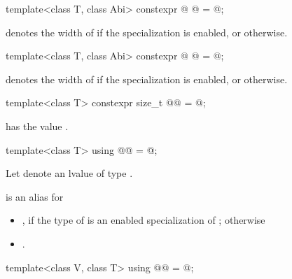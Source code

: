 \begin{itemdecl}
template<class T, class Abi>
  constexpr @ @ = @\seebelow@;
\end{itemdecl}

\begin{itemdescr}
\pnum
{} denotes the width of  if the specialization  is enabled, or 
otherwise.
\end{itemdescr}

\begin{itemdecl}
template<class T, class Abi>
  constexpr @ @ = @\seebelow@;
\end{itemdecl}

\begin{itemdescr}
\pnum
{} denotes
the width of 
if the specialization  is enabled, or
 otherwise.
\end{itemdescr}

\begin{itemdecl}
template<class T> constexpr size_t @@ = @\seebelow@;
\end{itemdecl}

\begin{itemdescr}
\pnum
{} has the value
.
\end{itemdescr}

\begin{itemdecl}
template<class T> using @@ = @\seebelow@;
\end{itemdecl}

\begin{itemdescr}
\pnum
Let  denote an lvalue of type .

\pnum
{} is an alias for
\begin{itemize}
 \item
   , if the type of  is an enabled
   specialization of ; otherwise
 \item
   .
\end{itemize}
\end{itemdescr}

\begin{itemdecl}
template<class V, class T> using @@ = @\seebelow@;
\end{itemdecl}

